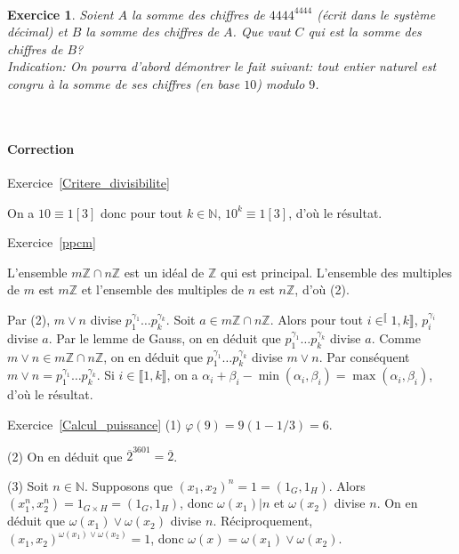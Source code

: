 \documentclass[11pt,a4paper]{article}
\newtheorem{ex}{Exercice}
\newcommand{\N}{\mathbb{N}}
\newcommand{\Z}{\mathbb{Z}}
\begin{document}
\

\begin{ex}\label{Somme_chiffres}
Soient $A$ la somme des chiffres de $4444^{4444}$ (écrit dans le système décimal) et $B$ la somme des chiffres de $A$. Que vaut $C$ qui est la somme des chiffres de $B$?\\
\textit{Indication: On pourra d'abord démontrer le fait suivant: tout entier naturel  est congru à la somme de ses chiffres (en base $10$) modulo $9$.}

\end{ex}

\


\paragraph{Correction}






Exercice~\ref{Critere_divisibilite}

On a $10\equiv 1[3]$ donc pour tout $k\in \N$, $10^k\equiv 1[3]$, d'où le résultat.







Exercice~\ref{ppcm}

L'ensemble $m\Z\cap n\Z$ est un idéal de $\Z$ qui est principal. L'ensemble des multiples de $m$ est $m\Z$ et l'ensemble des multiples de $n$ est $n\Z$, d'où (2).

Par (2), $m\vee n$ divise $p_1^{\gamma_1}\ldots p_k^{\gamma_k}$. Soit $a\in m\Z\cap n\Z$. Alors  pour tout $i\in^\llbracket 1,k\rrbracket$, $p_i^{\gamma_i}$ divise $a$. Par le lemme de Gauss, on en déduit que $p_1^{\gamma_1} \ldots p_k^{\gamma_k}$ divise $a$. Comme $m\vee n\in m\Z\cap n\Z$, on en déduit que $p_1^{\gamma_1} \ldots p_k^{\gamma_k}$ divise $m\vee n$.  Par conséquent $m\vee n=p_1^{\gamma_1}\ldots p_k^{\gamma_k}$. Si $i\in \llbracket 1,k\rrbracket$, on a $\alpha_i+\beta_i-\min(\alpha_i,\beta_i)=\max(\alpha_i,\beta_i)$, d'où le résultat.


Exercice~\ref{Calcul_puissance}
(1) $\varphi(9)=9(1-1/3)=6$.

(2) On en déduit que $\overline{2}^{3601}=\overline{2}$.

(3) Soit $n\in \N$. Supposons que $(x_1,x_2)^n=1=(1_G,1_H)$. Alors $(x_1^n,x_2^n)=1_{G\times H}=(1_G,1_H)$, donc $\omega(x_1)| n$ et $\omega(x_2)$ divise $n$. On en déduit que $\omega(x_1)\vee \omega(x_2)$ divise $n$. Réciproquement, $(x_1,x_2)^{\omega(x_1)\vee \omega(x_2)}=1$, donc $\omega(x)=\omega(x_1)\vee \omega(x_2)$. 
\end{document}
